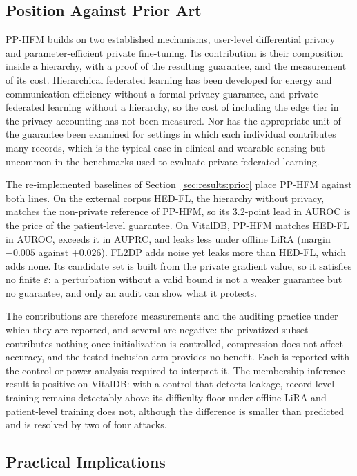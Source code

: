 \subsection{Position Against Prior Art}
\label{sec:discussion:position}

PP-HFM builds on two established mechanisms, user-level differential
privacy and parameter-efficient private fine-tuning. Its contribution is their
composition inside a hierarchy, with a proof of the resulting guarantee, and
the measurement of its cost. Hierarchical federated
learning has been developed for energy and communication efficiency without a
formal privacy guarantee, and private federated learning without a hierarchy,
so the cost of including the edge tier in the privacy accounting has not been
measured. Nor has the appropriate unit of the guarantee been examined for
settings in which each individual contributes many records, which is the
typical case in clinical and wearable sensing but uncommon in the benchmarks
used to evaluate private federated learning.

The re-implemented baselines of Section~\ref{sec:results:prior} place PP-HFM
against both lines. On the external corpus HED-FL, the hierarchy without
privacy, matches the non-private reference of PP-HFM, so its $3.2$-point lead
in AUROC is the price of the patient-level guarantee. On VitalDB, PP-HFM matches
HED-FL in AUROC, exceeds it in AUPRC, and leaks less under offline LiRA (margin
$-0.005$ against $+0.026$). FL2DP adds noise yet leaks more than HED-FL, which adds none. Its
candidate set is built from the private gradient value, so it satisfies no
finite $\varepsilon$: a perturbation without a valid bound is not a weaker
guarantee but no guarantee, and only an audit can show what it protects.

The contributions are therefore measurements and the auditing practice under
which they are reported, and several are negative: the privatized subset
contributes nothing once initialization is controlled, compression does not
affect accuracy, and the tested inclusion arm provides no benefit. Each is
reported with the control or power analysis required to interpret it. The
membership-inference result is positive on VitalDB: with a control that
detects leakage, record-level training remains detectably above its
difficulty floor under offline LiRA and patient-level training does not,
although the difference is smaller than predicted and is resolved by two of
four attacks.

\subsection{Practical Implications}
\label{sec:discussion:practice}

